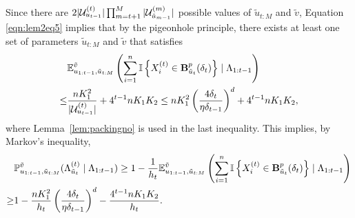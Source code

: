 Since there are $2 | \Utemp{t-1}{t}  |  \prod_{m=t+1}^M  | \mc{U}_{\tilde u_{m-1}}^{(m)}  |$ possible values of $\tilde u_{t:M}$ and $\tilde v$, Equation \ref{eqn:lem2eq5} implies that by the pigeonhole principle, there exists 
at least one set of parameters $\tilde u_{t:M}$ and $\tilde v$ that satisfies 
\begin{align*}
	&\exptuvtildet \left (\sum_{i=1}^n \IND{ X_{i}^{(t)}\in \ballp{\tilde u_t}{\delta_t} } 
	\mid \EvSmSplFrmOneTo{t-1} \right )\\
	\leq& \frac{n K_1^2}{| \Utemp{t-1}{t}  |} +4^{t-1} n K_1 K_2
	\leq n K_1^2 \left ( \frac{4\delta_t} {\eta \delta_{t-1}} \right )^d + 4^{t-1} n K_1 K_2,
\end{align*}
where Lemma~\ref{lem:packingno} is used in the last inequality.
This implies, by Markov's inequality,
\begin{align*}
	& \probuvtildet (\EvSmSpltildet \mid \EvSmSplFrmOneTo{t-1}) \geq 1 - \frac{1}{h_t} \exptuvtildet \left (\sum_{i=1}^n \IND{ X_{i}^{(t)}\in \ballp{\tilde u_t}{\delta_t} } \mid \EvSmSplFrmOneTo{t-1} \right ) \\
	\geq & 1 - \frac{n K_1^2}{h_t} \left ( \frac{4\delta_t} {\eta \delta_{t-1}} \right )^d - \frac{4^{t-1} n K_1 K_2}{h_t}.
\end{align*}

